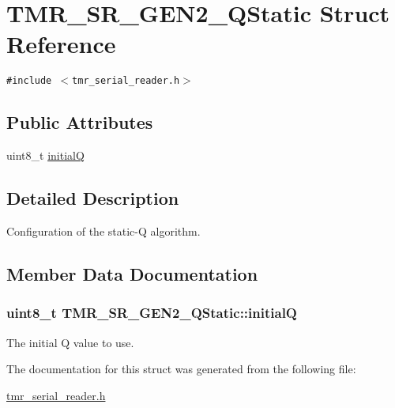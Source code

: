 \hypertarget{struct_t_m_r___s_r___g_e_n2___q_static}{
\section{TMR\_\-SR\_\-GEN2\_\-QStatic Struct Reference}
\label{struct_t_m_r___s_r___g_e_n2___q_static}
}
{\tt \#include $<$tmr\_\-serial\_\-reader.h$>$}

\subsection*{Public Attributes}
\begin{CompactItemize}
\item 
uint8\_\-t \hyperlink{struct_t_m_r___s_r___g_e_n2___q_static_f86f66373925716352af16240ddd0839}{initialQ}
\end{CompactItemize}


\subsection{Detailed Description}
Configuration of the static-Q algorithm. 

\subsection{Member Data Documentation}
\hypertarget{struct_t_m_r___s_r___g_e_n2___q_static_f86f66373925716352af16240ddd0839}{
\subsubsection[{initialQ}]{\setlength{\rightskip}{0pt plus 5cm}uint8\_\-t {\bf TMR\_\-SR\_\-GEN2\_\-QStatic::initialQ}}}
\label{struct_t_m_r___s_r___g_e_n2___q_static_f86f66373925716352af16240ddd0839}


The initial Q value to use. 

The documentation for this struct was generated from the following file:\begin{CompactItemize}
\item 
\hyperlink{tmr__serial__reader_8h}{tmr\_\-serial\_\-reader.h}\end{CompactItemize}
